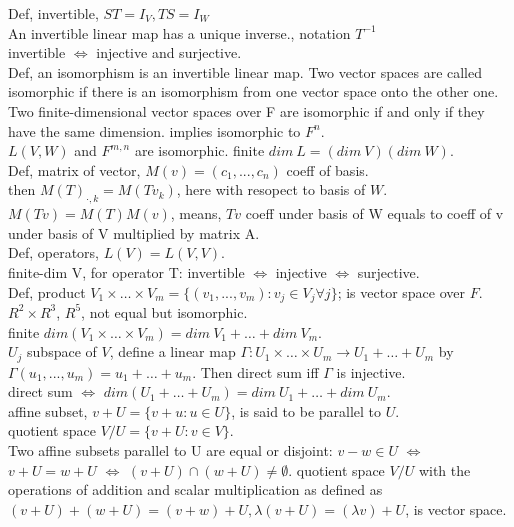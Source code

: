 \documentclass[paper=a4, fontsize=11pt]{scrartcl} %
\numberwithin{equation}{section} %
\numberwithin{figure}{section} %
\numberwithin{table}{section} %
\begin{document}
Def, invertible, $ST=I_V, TS=I_W$\\
An invertible linear map has a unique inverse., notation $T^{-1}$\\
invertible $\Leftrightarrow$ injective and surjective.\\
Def, an isomorphism is an invertible linear map. Two vector spaces are called isomorphic if there is an isomorphism from one vector space onto the other one.\\
Two finite-dimensional vector spaces over F are isomorphic if and only if they have the same dimension. implies isomorphic to $F^n$.\\
$L(V,W)$ and $F^{m,n}$ are isomorphic. finite $dim\ L = (dim\ V)(dim\ W)$.\\
Def, matrix of vector, $M(v) = (c_1,...,c_n)$ coeff of basis.\\
then ${M(T)}_{\cdot,k} = M(Tv_k)$, here with resopect to basis of $W$.\\
$M(Tv) = M(T)M(v)$, means, $Tv$ coeff under basis of W equals to coeff of v under basis of V multiplied by matrix A.\\
Def, operators, $L(V) = L(V,V)$.\\
finite-dim V, for operator T: invertible $\Leftrightarrow$ injective $\Leftrightarrow$ surjective.\\
Def, product $V_1 \times\dots\times V_m = \{(v_1,...,v_m): v_j\in V_j \forall j\}$; is vector space over $F$.\\
$R^2\times R^3$, $R^5$, not equal but isomorphic.\\
finite $dim(V_1 \times\dots\times V_m) = dim\ V_1 + \dots + dim\ V_m$.\\
$U_j$ subspace of $V$, define a linear map $\Gamma: U_1 \times \dots\times U_m \rightarrow U_1+\dots +U_m$ by $\Gamma(u_1,...,u_m)=u_1+\dots+u_m$. Then direct sum iff $\Gamma$ is injective.\\
direct sum $\Leftrightarrow$ $dim(U_1+\dots +U_m) = dim\ U_1+ \dots + dim\ U_m$.\\
affine subset, $v+U =\{v+u: u\in U\}$, is said to be parallel to $U$.\\
quotient space $V/U = \{v+U: v\in V\}$.\\
Two affine subsets parallel to U are equal or disjoint: $v-w\in U$ $\Leftrightarrow$ $v+U=w+U$ $\Leftrightarrow$ $(v+U)\cap (w+U)\neq\emptyset$.
quotient space $V/U$ with the operations of addition and scalar multiplication as defined as $(v+U) +(w+U) = (v+w) +U, \lambda(v+U) = (\lambda v) +U$, is vector space.\\
\end{document}
